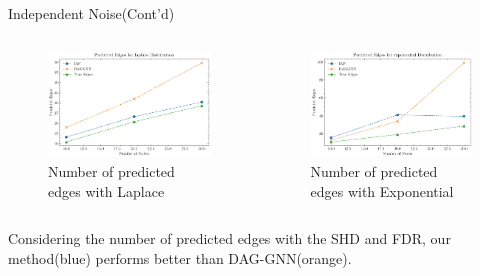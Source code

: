 \documentclass{beamer}
\begin{document}
\begin{frame}{Independent Noise(Cont'd)}
    \begin{columns}
        \begin{column}{0.5\textwidth}
            \begin{figure}
                \centering
                \includegraphics[width=\textwidth]{fig/Predicted Edges_independence_laplace.pdf}
                \caption{Number of predicted edges with Laplace}
                \label{fig:ind_laplace_edges}
            \end{figure}
        \end{column}
        \begin{column}{0.5\textwidth}
            \begin{figure}
                \centering
                \includegraphics[width=\textwidth]{fig/Predicted Edges_independence_exponential.pdf}
                \caption{Number of predicted edges with Exponential}
                \label{fig:ind_exponential_edges}
            \end{figure}
        \end{column}
    \end{columns}
    Considering the number of predicted edges with the SHD and FDR, our method(blue) performs better than DAG-GNN(orange).
\end{frame}
\end{document}
